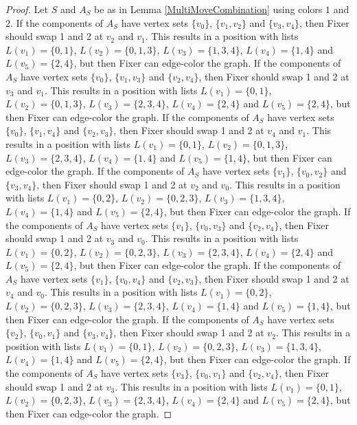\documentclass[12pt]{amsart}
\theoremstyle{plain}
\theoremstyle{definition}
\theoremstyle{remark}
\begin{document}
\begin{proof}
Let $S$ and $A_S$ be as in Lemma \ref{MultiMoveCombination} using colors $1$ and $2$. If the components of $A_S$ have vertex sets $\{v_0\}$, $\{v_1, v_2\}$ and $\{v_3, v_4\}$, then Fixer should swap 1 and 2 at $v_2$ and $v_1$. This results in a position with lists $L(v_1) = \{0, 1\}$, $L(v_2) = \{0, 1, 3\}$, $L(v_3) = \{1, 3, 4\}$, $L(v_4) = \{1, 4\}$ and $L(v_5) = \{2, 4\}$, but then Fixer can edge-color the graph.
If the components of $A_S$ have vertex sets $\{v_0\}$, $\{v_1, v_3\}$ and $\{v_2, v_4\}$, then Fixer should swap 1 and 2 at $v_3$ and $v_1$. This results in a position with lists $L(v_1) = \{0, 1\}$, $L(v_2) = \{0, 1, 3\}$, $L(v_3) = \{2, 3, 4\}$, $L(v_4) = \{2, 4\}$ and $L(v_5) = \{2, 4\}$, but then Fixer can edge-color the graph.
If the components of $A_S$ have vertex sets $\{v_0\}$, $\{v_1, v_4\}$ and $\{v_2, v_3\}$, then Fixer should swap 1 and 2 at $v_4$ and $v_1$. This results in a position with lists $L(v_1) = \{0, 1\}$, $L(v_2) = \{0, 1, 3\}$, $L(v_3) = \{2, 3, 4\}$, $L(v_4) = \{1, 4\}$ and $L(v_5) = \{1, 4\}$, but then Fixer can edge-color the graph.
If the components of $A_S$ have vertex sets $\{v_1\}$, $\{v_0, v_2\}$ and $\{v_3, v_4\}$, then Fixer should swap 1 and 2 at $v_2$ and $v_0$. This results in a position with lists $L(v_1) = \{0, 2\}$, $L(v_2) = \{0, 2, 3\}$, $L(v_3) = \{1, 3, 4\}$, $L(v_4) = \{1, 4\}$ and $L(v_5) = \{2, 4\}$, but then Fixer can edge-color the graph.
If the components of $A_S$ have vertex sets $\{v_1\}$, $\{v_0, v_3\}$ and $\{v_2, v_4\}$, then Fixer should swap 1 and 2 at $v_3$ and $v_0$. This results in a position with lists $L(v_1) = \{0, 2\}$, $L(v_2) = \{0, 2, 3\}$, $L(v_3) = \{2, 3, 4\}$, $L(v_4) = \{2, 4\}$ and $L(v_5) = \{2, 4\}$, but then Fixer can edge-color the graph.
If the components of $A_S$ have vertex sets $\{v_1\}$, $\{v_0, v_4\}$ and $\{v_2, v_3\}$, then Fixer should swap 1 and 2 at $v_4$ and $v_0$. This results in a position with lists $L(v_1) = \{0, 2\}$, $L(v_2) = \{0, 2, 3\}$, $L(v_3) = \{2, 3, 4\}$, $L(v_4) = \{1, 4\}$ and $L(v_5) = \{1, 4\}$, but then Fixer can edge-color the graph.
If the components of $A_S$ have vertex sets $\{v_2\}$, $\{v_0, v_1\}$ and $\{v_3, v_4\}$, then Fixer should swap 1 and 2 at $v_2$. This results in a position with lists $L(v_1) = \{0, 1\}$, $L(v_2) = \{0, 2, 3\}$, $L(v_3) = \{1, 3, 4\}$, $L(v_4) = \{1, 4\}$ and $L(v_5) = \{2, 4\}$, but then Fixer can edge-color the graph.
If the components of $A_S$ have vertex sets $\{v_3\}$, $\{v_0, v_1\}$ and $\{v_2, v_4\}$, then Fixer should swap 1 and 2 at $v_3$. This results in a position with lists $L(v_1) = \{0, 1\}$, $L(v_2) = \{0, 2, 3\}$, $L(v_3) = \{2, 3, 4\}$, $L(v_4) = \{2, 4\}$ and $L(v_5) = \{2, 4\}$, but then Fixer can edge-color the graph.

\end{proof}
\end{document}
